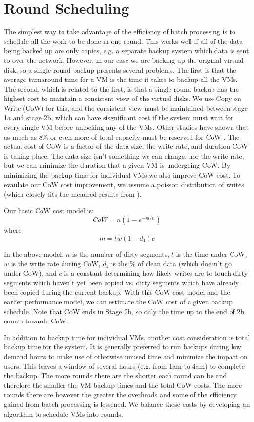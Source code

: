 \section{Round Scheduling}
\label{sect:scheduling}
The simplest way to take advantage of the efficiency of batch processing is to
schedule all the work to be done in one round.  This works well if all of the
data being backed up are only copies, e.g. a separate backup system which data
is sent to over the network. However, in our case we are backing up the
original virtual disk, so a single round backup presents several problems.
The first is that the average turnaround time for a VM is the time it takes to
backup all the VMs. The second, which is related to the first, is that a single
round backup has the highest cost to maintain a consistent view of the virtual
disks. We use Copy on Write (CoW) for this, and the consistent view must be
maintained between stage 1a and stage 2b, which can have sisgnificant cost if
the system must wait for every single VM before unlocking any of the VMs.
Other studies have
shown that as much as 8\% or even more of total capacity must be reserved for
CoW \cite{EMCIncrementalDataChanges}. The actual cost of CoW is a factor of the
data size, the write rate, and duration CoW is taking place. The data size
isn't something we can change, nor the write rate, but we can minimize the
duration that a given VM is undergoing CoW. By minimizing the backup time for
individual VMs we also improve CoW cost. To evaulate our
CoW cost improvement, we assume a poisson distribution of
writes (which closely fits the meaured results from
\cite{EMCIncrementalDataChanges}).

Our basic CoW cost model is:
\[
    CoW=n(1-e^{-m/n})
\]
    where
\[
    m=tw(1-d_1)c
\]

In the above model, $n$ is the number of dirty segments, $t$ is the time under
CoW, $w$ is the
write rate during CoW, $d_1$ is the \% of clean data (which doesn't go under
CoW), and $c$ is a constant determining how likely writes are to touch dirty
segments which haven't yet been copied vs. dirty segments which have already
been copied during the current backup. With this CoW cost model and the earlier
performance model, we can estimate the CoW cost of a given backup schedule.
Note that CoW ends in Stage 2b, so only the time up to the end of 2b counts
towards CoW. 

In addition to backup time for individual VMs, another cost consideration is
total backup time for the system. It is generally preferred to run backups
during low demand hours to make use of otherwise unused time and minimize the
impact on users. This leaves a window of several hours (e.g. from 1am to 4am)
to complete the backup. The more rounds there
are the shorter each round can be and therefore the smaller the VM backup times
and the total CoW costs. The
more rounds there are however the greater the overheads and some of the
efficiency gained from batch processing is lessened. We balance these costs by
developing an algorithm to schedule VMs into rounds.

